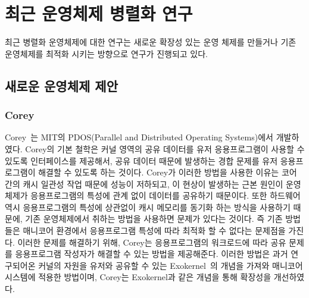 
\newpage
\section{최근 운영체제 병렬화 연구}
\label{sec:osrelated}


최근 병렬화 운영체제에 대한 연구는 새로운 확장성 있는 운영 체제를 만들거나 
기존 운영체제를 최적화 시키는 방향으로 연구가 진행되고 있다.


\subsection{새로운 운영체제 제안}

\subsubsection{Corey}
Corey~\cite{Boyd-WickizerCorey}는 MIT의 PDOS(Parallel and Distributed Operating
Systems)에서 개발하였다.
Corey의 기본 철학은 커널 영역의 공유 데이터를 유저 응용프로그램이 사용할 수 있도록 인터페이스를 제공해서,
공유 데이터 때문에 발생하는 경합 문제를 유저 응용프로그램이 해결할 수 있도록 하는 것이다.
Corey가 이러한 방법을 사용한 이유는 코어 간의 캐시 일관성 작업 
때문에 성능이 저하되고, 이 현상이 발생하는 근본 원인이 운영체제가 응용프로그램의 특성에 관계 없이 
데이터를 공유하기 때문이다.
또한 하드웨어 역시 응용프로그램의 특성에 상관없이 캐시 메모리를 동기화 하는 방식을 사용하기 때문에,
기존 운영체제에서 취하는 방법을 사용하면 문제가 있다는 것이다. 
즉 기존 방법들은 매니코어 환경에서 응용프로그램 특성에 따라 최적화 할 수 없다는 문제점을 가진다. 
이러한 문제를 해결하기 위해, Corey는 응용프로그램의 워크로드에 따라 공유 문제를 응용프로그램 작성자가 
해결할 수 있는 방법을 제공해준다.
이러한 방법은 과거 연구되어온 커널의 자원을 유저와 공유할 수 있는 Exokernel~\cite{Engler1995EOS}의 개념을 가져와 
매니코어 시스템에 적용한 방법이며, Corey는 Exokernel과 같은 개념을 통해 확장성을 개선하였다.


